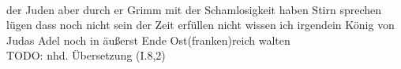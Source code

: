 \begin{exe}
\ex \label{ex:I4769} \gll {}                                    \\
{der} {Juden} {aber} {durch} {er} {Grimm} {mit} {der} {Schamlosigkeit} {haben} {Stirn} {sprechen} {lügen} {dass} {noch} {nicht} {sein} {der} {Zeit} {erfüllen} {} {nicht} {wissen} {ich} {irgendein} {König} {von} {Judas} {Adel} {noch} {in} {äußerst} {Ende} {Ost(franken)reich} {walten} {}\\
\glt TODO: nhd. Übersetzung (I.8,2)
\end{exe}
